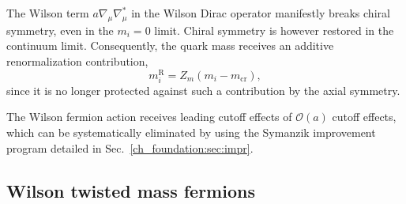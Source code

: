 The Wilson term $a\nabla_{\mu}\nabla_{\mu}^*$ in the Wilson Dirac operator manifestly breaks chiral symmetry, even in the $m_i=0$ limit. Chiral symmetry is however restored in the continuum limit. Consequently, the quark mass receives an additive renormalization contribution, 
\begin{equation}
m_i^{\textrm{R}}=Z_m\left(m_i-m_{\textrm{cr}}\right),
\end{equation}
since it is no longer protected against such a contribution by the axial symmetry.

The Wilson fermion action receives leading cutoff effects of $\mathcal{O}(a)$ cutoff effects, which can be systematically eliminated by using the Symanzik improvement program detailed in Sec.~\ref{ch_foundation:sec:impr}.


\subsection{Wilson twisted mass fermions}
\label{ch_foundation:subsec:tm}

